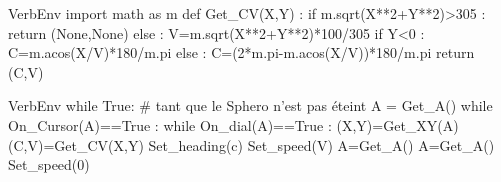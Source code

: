 \begin{SaveVerbatim}{VerbEnv}
import math as m
def Get_CV(X,Y) :
   if m.sqrt(X**2+Y**2)>305 :
      return (None,None)
   else :
      V=m.sqrt(X**2+Y**2)*100/305
      if Y<0 :
        C=m.acos(X/V)*180/m.pi
      else :
        C=(2*m.pi-m.acos(X/V))*180/m.pi
        return (C,V)
\end{SaveVerbatim}


\begin{SaveVerbatim}{VerbEnv}
while True: # tant que le Sphero n'est pas éteint A = Get_A()
while On_Cursor(A)==True : 
     while On_dial(A)==True :
       (X,Y)=Get_XY(A)
       (C,V)=Get_CV(X,Y)
       Set_heading(c)
       Set_speed(V)
       A=Get_A()
     A=Get_A()
  Set_speed(0)
\end{SaveVerbatim}

\newpage


